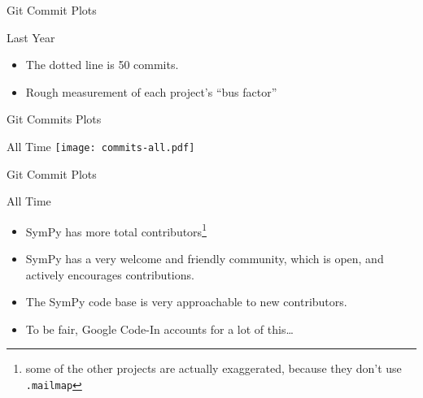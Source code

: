 \documentclass[xcolor=svgnames]{beamer}
\begin{document}
\begin{frame}{Git Commit Plots}
  \begin{block}{Last Year}
    \begin{itemize}
    \item The dotted line is 50 commits.
    \item Rough measurement of each project's ``bus factor''
    \end{itemize}
  \end{block}
\end{frame}

\begin{frame}{Git Commits Plots}
  \begin{block}{All Time}
    \texttt{[image: commits-all.pdf]}
  \end{block}
\end{frame}

\begin{frame}{Git Commit Plots}
  \begin{block}{All Time}
    \begin{itemize}
    \item SymPy has more total contributors\footnote{some of the other projects are actually exaggerated,
        because they don't use \texttt{.mailmap}}
    \item SymPy has a very welcome and friendly community, which is open, and
      actively encourages contributions.
    \item The SymPy code base is very approachable to new contributors.
    \item To be fair, Google Code-In accounts for a lot of this\ldots
    \end{itemize}
  \end{block}
\end{frame}
\end{document}

